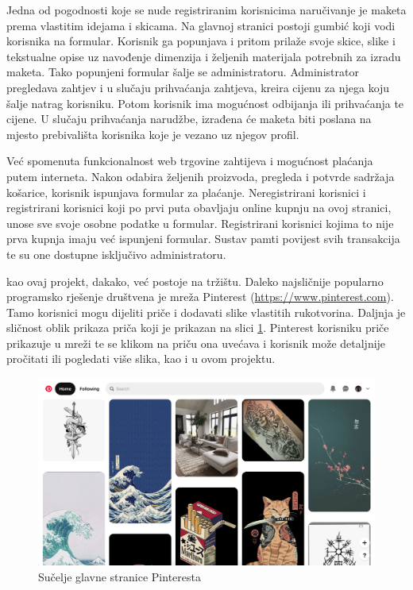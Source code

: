 		Jedna od pogodnosti koje se nude registriranim korisnicima naručivanje je maketa prema vlastitim idejama i skicama. Na glavnoj stranici postoji gumbić koji vodi korisnika na formular. Korisnik ga popunjava i pritom prilaže svoje skice, slike i tekstualne opise uz navođenje dimenzija i željenih materijala potrebnih za izradu maketa. Tako popunjeni formular šalje se administratoru. Administrator pregledava zahtjev i u slučaju prihvaćanja zahtjeva, kreira cijenu za njega koju šalje natrag korisniku. Potom korisnik ima mogućnost odbijanja ili prihvaćanja te cijene. U slučaju prihvaćanja narudžbe, izrađena će maketa biti poslana na mjesto prebivališta korisnika koje je vezano uz njegov profil.
		
		Već spomenuta funkcionalnost web trgovine zahtijeva i mogućnost plaćanja putem interneta. Nakon odabira željenih proizvoda, pregleda i potvrde sadržaja košarice, korisnik ispunjava formular za plaćanje. Neregistrirani korisnici i registrirani korisnici koji po prvi puta obavljaju online kupnju na ovoj stranici, unose sve svoje osobne podatke u formular. Registrirani korisnici kojima to nije prva kupnja imaju već ispunjeni formular. Sustav pamti povijest svih transakcija te su one dostupne isključivo administratoru.
		
		 kao ovaj projekt, dakako, već postoje na tržištu. Daleko najsličnije popularno programsko rješenje društvena je mreža Pinterest (\url{https://www.pinterest.com}). Tamo korisnici mogu dijeliti priče i dodavati slike vlastitih rukotvorina. Daljnja je sličnost oblik prikaza priča koji je prikazan na slici \ref{fig:pinterest}. Pinterest korisniku priče prikazuje u mreži te se klikom na priču ona uvećava i korisnik može detaljnije pročitati ili pogledati više slika, kao i u ovom projektu.
		
		\begin{figure}[H]
			\includegraphics[scale=0.32]{slike/pinterest.PNG} %
			\centering
			\caption{Sučelje glavne stranice Pinteresta}
			\label{fig:pinterest}
		\end{figure}
	
